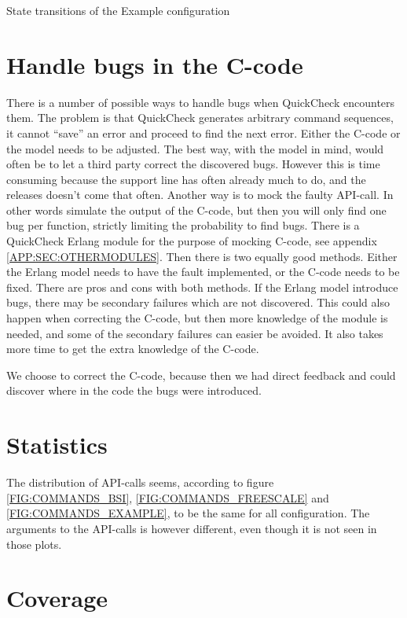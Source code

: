 \begin{table}[!ht]
  \caption{State transitions of the Example configuration}
  \label{TABLE:STATUSES_EXAMPLE}
  
\end{table}

\section{Handle bugs in the C-code}
\label{sec:handlebugs}
There is a number of possible ways to handle bugs when QuickCheck
encounters them. The problem is that QuickCheck generates arbitrary
command sequences, it cannot ``save'' an error and proceed to find the
next error. Either the C-code or the model needs to be adjusted.  The
best way, with the model in mind, would often be to let a third party
correct the discovered bugs. However this is time consuming because
the support line has often already much to do, and the releases
doesn't come that often.  Another way is to mock the faulty
API-call. In other words simulate the output of the C-code, but then
you will only find one bug per function, strictly limiting the probability
to find bugs. There is a QuickCheck Erlang module for the purpose of
mocking C-code, see appendix \ref{APP:SEC:OTHERMODULES}. Then there is
two equally good methods. Either the Erlang model needs to have the
fault implemented, or the C-code needs to be fixed. There are pros and
cons with both methods. If the Erlang model introduce bugs, there may
be secondary failures which are not discovered. This could also happen
when correcting the C-code, but then more knowledge of the module is
needed, and some of the secondary failures can easier be avoided. It
also takes more time to get the extra knowledge of the C-code.

We choose to correct the C-code, because then we had direct feedback
and could discover where in the code the bugs were introduced.

\section{Statistics}
The distribution of API-calls seems, according to figure
\ref{FIG:COMMANDS_BSI}, \ref{FIG:COMMANDS_FREESCALE} and
\ref{FIG:COMMANDS_EXAMPLE}, to be the same for all configuration. The
arguments to the API-calls is however different, even though it is not
seen in those plots.

\section{Coverage}
\label{SEC:COVERAGE}
